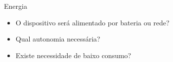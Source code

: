 
\begin{frame}{Energia}
    \begin{itemize}
        \item O dispositivo será alimentado por bateria ou rede?
        \item Qual autonomia necessária?
        \item Existe necessidade de baixo consumo?
    \end{itemize}
\end{frame}
